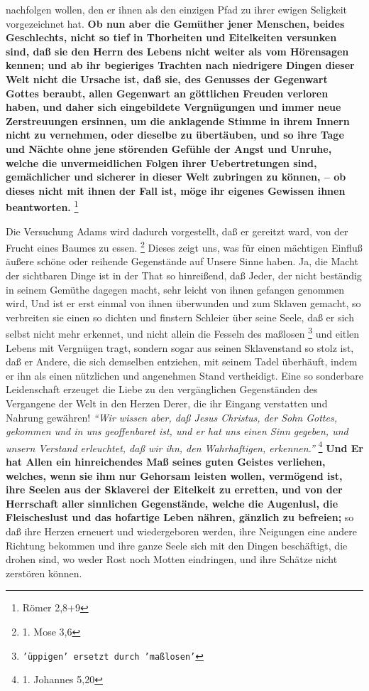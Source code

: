 {nachfolgen wollen, den er ihnen
als den einzigen Pfad zu ihrer ewigen Seligkeit vorgezeichnet hat. \textbf{Ob
nun aber
die Gemüther jener Menschen, beides Geschlechts, nicht so tief in Thorheiten und
Eitelkeiten versunken sind, daß sie den Herrn des Lebens nicht weiter als vom
Hörensagen kennen; und ab ihr begieriges Trachten nach niedrigere Dingen dieser
Welt nicht die Ursache ist, daß sie, des Genusses der Gegenwart Gottes beraubt,
allen Gegenwart an göttlichen Freuden verloren haben, und daher sich
eingebildete Vergnügungen und immer neue Zerstreuungen ersinnen, um die
anklagende Stimme in ihrem Innern nicht zu vernehmen, oder dieselbe zu
übertäuben, und so ihre Tage und Nächte ohne jene störenden Gefühle der Angst
und Unruhe, welche die unvermeidlichen Folgen ihrer Uebertretungen sind,
gemächlicher und sicherer in dieser Welt zubringen zu können, -- ob dieses nicht
mit ihnen der Fall ist, möge ihr eigenes Gewissen ihnen
beantworten.}
\footnote{Römer 2,8+9}

\medskip

Die Versuchung Adams wird dadurch vorgestellt, daß er gereitzt ward, von der
Frucht eines Baumes zu essen.
\footnote{1. Mose 3,6}
Dieses zeigt uns, was für
einen mächtigen Einfluß äußere schöne oder reihende Gegenstände auf Unsere Sinne
haben. Ja, die Macht der sichtbaren Dinge ist in der That so hinreißend, daß
Jeder, der nicht beständig in seinem Gemüthe dagegen macht, sehr leicht von
ihnen gefangen genommen wird, Und ist er erst einmal von ihnen überwunden und
zum Sklaven gemacht, so verbreiten sie einen so dichten
und finstern Schleier
über seine Seele, daß er sich selbst nicht mehr erkennet, und nicht allein die
Fesseln des maßlosen
\footnote{\texttt{'üppigen' ersetzt durch 'maßlosen'}} und eitlen Lebens mit
Vergnügen tragt, sondern sogar aus
seinen Sklavenstand so stolz ist, daß er Andere, die sich
demselben entziehen,
mit seinem Tadel überhäuft, indem er ihn als einen nützlichen und angenehmen
Stand vertheidigt. Eine so sonderbare Leidenschaft erzeuget die Liebe zu den
vergänglichen Gegenständen des Vergangene der Welt in den Herzen Derer, die ihr
Eingang verstatten und Nahrung gewähren!
\textit{"`Wir wissen aber, daß Jesus Christus,
der Sohn Gottes, gekommen und in uns geoffenbaret ist, und er hat uns einen Sinn
gegeben, und unsern Verstand erleuchtet, daß wir ihn, den Wahrhaftigen,
erkennen."'}
\footnote{1. Johannes 5,20}
\textbf{Und Er hat Allen ein hinreichendes Maß seines
guten Geistes verliehen, welches, wenn sie ihm nur Gehorsam leisten wollen,
vermögend ist, ihre Seelen aus der Sklaverei der Eitelkeit zu erretten, und von
der Herrschaft aller sinnlichen Gegenstände, welche die Augenlusl, die
Fleischeslust und das hofartige Leben nähren, gänzlich zu befreien;} so daß ihre
Herzen erneuert und wiedergeboren werden, ihre Neigungen
eine andere Richtung
bekommen und ihre ganze Seele sich mit den Dingen beschäftigt, die drohen sind,
wo weder Rost noch Motten eindringen, und ihre Schätze nicht zerstören können.

}
